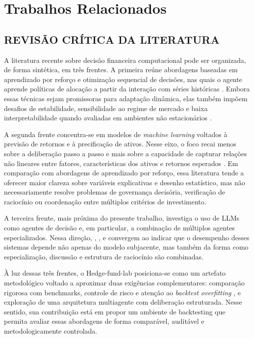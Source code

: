 \documentclass{eic-bcc-tcc}
\begin{document}
\chapter{Trabalhos Relacionados}
\label{cha:relacionados}

\section{REVISÃO CRÍTICA DA LITERATURA}

A literatura recente sobre decisão financeira computacional pode ser organizada, de forma sintética, em três frentes. A primeira reúne abordagens baseadas em aprendizado por reforço e otimização sequencial de decisões, nas quais o agente aprende políticas de alocação a partir da interação com séries históricas \citep{Moody2001, SuttonBarto2018, Schulman2017, Jiang2017}. Embora essas técnicas sejam promissoras para adaptação dinâmica, elas também impõem desafios de estabilidade, sensibilidade ao regime de mercado e baixa interpretabilidade quando avaliadas em ambientes não estacionários \citep{Jiang2017}.

A segunda frente concentra-se em modelos de \textit{machine learning} voltados à previsão de retornos e à precificação de ativos. Nesse eixo, o foco recai menos sobre a deliberação passo a passo e mais sobre a capacidade de capturar relações não lineares entre fatores, características dos ativos e retornos esperados \citep{Gu2020}. Em comparação com abordagens de aprendizado por reforço, essa literatura tende a oferecer maior clareza sobre variáveis explicativas e desenho estatístico, mas não necessariamente resolve problemas de governança decisória, verificação de raciocínio ou coordenação entre múltiplos critérios de investimento.

A terceira frente, mais próxima do presente trabalho, investiga o uso de LLMs como agentes de decisão e, em particular, a combinação de múltiplos agentes especializados. Nessa direção, \citet{Xia2026}, \citet{Li2023}, \citet{Xing2024} e \citet{FinCoT2026} convergem ao indicar que o desempenho desses sistemas depende não apenas do modelo subjacente, mas também da forma como especialização, discussão e estrutura de raciocínio são combinadas.

À luz dessas três frentes, o Hedge-fund-lab posiciona-se como um artefato metodológico voltado a aproximar duas exigências complementares: comparação rigorosa com benchmarks, controle de risco e atenção ao \textit{backtest overfitting} \citep{Bailey2014, LopezDePrado2018}, e exploração de uma arquitetura multiagente com deliberação estruturada. Nesse sentido, sua contribuição está em propor um ambiente de backtesting que permita avaliar essas abordagens de forma comparável, auditável e metodologicamente controlada.
\end{document}
